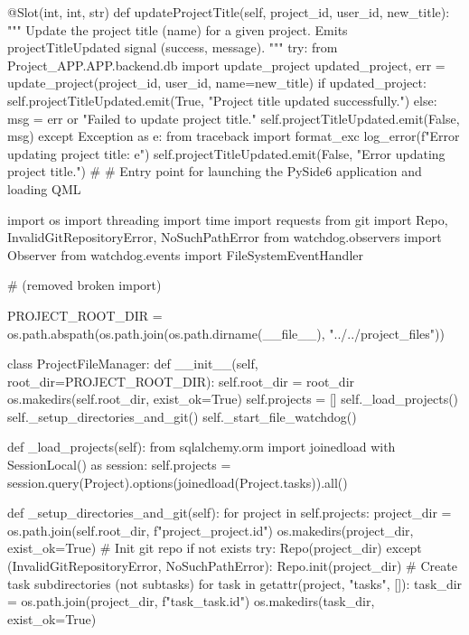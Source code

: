 \documentclass{report}
\begin{document}
\begin{python}
    @Slot(int, int, str)
    def updateProjectTitle(self, project_id, user_id, new_title):
        """
        Update the project title (name) for a given project.
        Emits projectTitleUpdated signal (success, message).
        """
        try:
            from Project_APP.APP.backend.db import update_project
            updated_project, err = update_project(project_id, user_id, name=new_title)
            if updated_project:
                self.projectTitleUpdated.emit(True, "Project title updated successfully.")
            else:
                msg = err or "Failed to update project title."
                self.projectTitleUpdated.emit(False, msg)
        except Exception as e:
            from traceback import format_exc
            log_error(f"Error updating project title: {e}")
            self.projectTitleUpdated.emit(False, "Error updating project title.")
# 
# Entry point for launching the PySide6 application and loading QML

import os
import threading
import time
import requests
from git import Repo, InvalidGitRepositoryError, NoSuchPathError
from watchdog.observers import Observer
from watchdog.events import FileSystemEventHandler

# (removed broken import)

PROJECT_ROOT_DIR = os.path.abspath(os.path.join(os.path.dirname(__file__), "../../project_files"))

class ProjectFileManager:
    def __init__(self, root_dir=PROJECT_ROOT_DIR):
        self.root_dir = root_dir
        os.makedirs(self.root_dir, exist_ok=True)
        self.projects = []
        self._load_projects()
        self._setup_directories_and_git()
        self._start_file_watchdog()

    def _load_projects(self):
        from sqlalchemy.orm import joinedload
        with SessionLocal() as session:
            self.projects = session.query(Project).options(joinedload(Project.tasks)).all()

    def _setup_directories_and_git(self):
        for project in self.projects:
            project_dir = os.path.join(self.root_dir, f"project_{project.id}")
            os.makedirs(project_dir, exist_ok=True)
            # Init git repo if not exists
            try:
                Repo(project_dir)
            except (InvalidGitRepositoryError, NoSuchPathError):
                Repo.init(project_dir)
            # Create task subdirectories (not subtasks)
            for task in getattr(project, "tasks", []):
                task_dir = os.path.join(project_dir, f"task_{task.id}")
                os.makedirs(task_dir, exist_ok=True)


\end{python}
\end{document}
